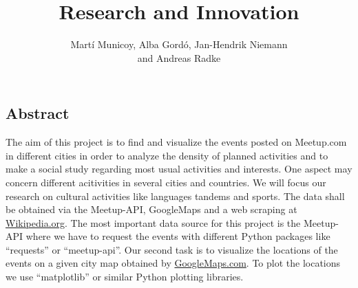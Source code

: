 \documentclass[12pt,a4paper]{article}
\author{Martí Municoy, Alba Gordó, Jan-Hendrik Niemann\\ and Andreas Radke}
\title{Research and Innovation}
\begin{document}
	\maketitle
	
\subsection*{Abstract}

The aim of this project is to find and visualize the events posted on Meetup.com in different cities in order to analyze the density of planned activities and to make a social study regarding most usual activities and interests. One aspect may concern different acitivities in several cities and countries. We will focus our research on cultural activities like languages tandems and sports. The data shall be obtained via the Meetup-API, GoogleMaps and a web scraping at \url{Wikipedia.org}. The most important data source for this project is the Meetup-API where we have to request the events with different Python packages like “requests” or “meetup-api”. Our second task is to visualize the locations of the events on a given city map obtained by \url{GoogleMaps.com}. To plot the locations we use “matplotlib” or similar Python plotting libraries.

\tableofcontents
	









\newpage

{}

\end{document}
